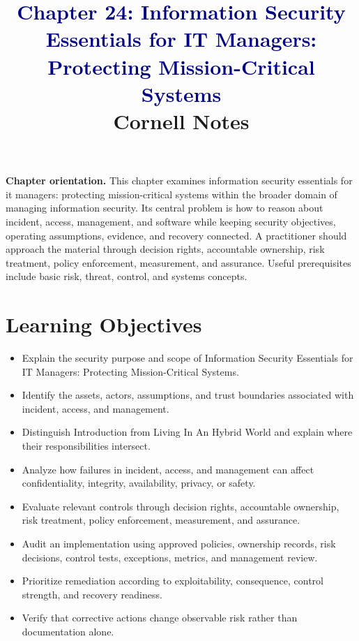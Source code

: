 \documentclass[11pt]{article}
\title{\textcolor{Navy}{Chapter 24: Information Security Essentials for IT Managers: Protecting Mission-Critical Systems}\\[2mm]\large Cornell Notes}
\author{}
\date{}
\begin{document}
\maketitle
\thispagestyle{fancy}
\vspace{-1.5em}
\begin{orientationbox}
\textbf{Chapter orientation.} This chapter examines information security essentials for it managers: protecting mission-critical systems within the broader domain of managing information security. Its central problem is how to reason about incident, access, management, and software while keeping security objectives, operating assumptions, evidence, and recovery connected. A practitioner should approach the material through decision rights, accountable ownership, risk treatment, policy enforcement, measurement, and assurance. Useful prerequisites include basic risk, threat, control, and systems concepts.
\end{orientationbox}
\section*{Learning Objectives}
\begin{itemize}
\item Explain the security purpose and scope of Information Security Essentials for IT Managers: Protecting Mission-Critical Systems.
\item Identify the assets, actors, assumptions, and trust boundaries associated with incident, access, and management.
\item Distinguish Introduction from Living In An Hybrid World and explain where their responsibilities intersect.
\item Analyze how failures in incident, access, and management can affect confidentiality, integrity, availability, privacy, or safety.
\item Evaluate relevant controls through decision rights, accountable ownership, risk treatment, policy enforcement, measurement, and assurance.
\item Audit an implementation using approved policies, ownership records, risk decisions, control tests, exceptions, metrics, and management review.
\item Prioritize remediation according to exploitability, consequence, control strength, and recovery readiness.
\item Verify that corrective actions change observable risk rather than documentation alone.
\end{itemize}
\end{document}
